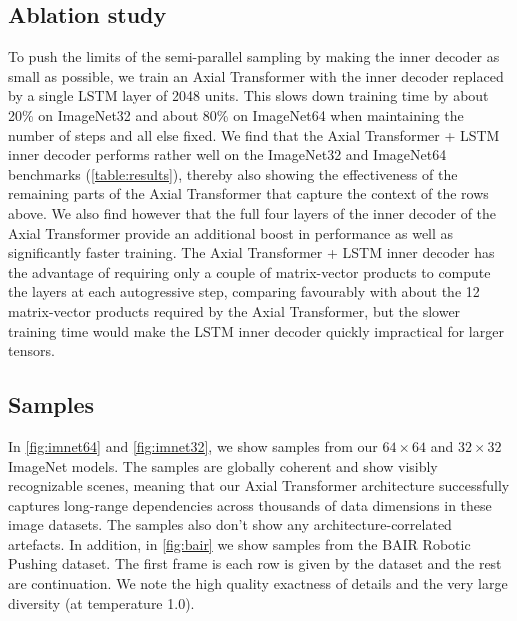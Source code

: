\documentclass{article} \usepackage{iclr2020_conference,times}
\begin{document}
\subsection{Ablation study}

To push the limits of the semi-parallel sampling by making the inner decoder as small as possible, we train an Axial Transformer with the inner decoder replaced by a single LSTM layer of 2048 units. This slows down training time by about 20\% on ImageNet32 and about 80\% on ImageNet64 when maintaining the number of steps and all else fixed. We find that the Axial Transformer + LSTM inner decoder performs rather well on the ImageNet32 and ImageNet64 benchmarks (\cref{table:results}), thereby also showing the effectiveness of the remaining parts of the Axial Transformer that capture the context of the rows above. We also find however that the full four layers of the inner decoder of the Axial Transformer provide an additional boost in performance as well as significantly faster training. The Axial Transformer + LSTM inner decoder has the advantage of requiring only a couple of matrix-vector products to compute the layers at each autogressive step, comparing favourably with about the 12 matrix-vector products required by the Axial Transformer, but the slower training time would make the LSTM inner decoder quickly impractical for larger tensors.

\subsection{Samples}

In \cref{fig:imnet64} and \cref{fig:imnet32}, we show samples from our $64 \times 64$ and $32 \times 32$ ImageNet models. The samples are globally coherent and show visibly recognizable scenes, meaning that our Axial Transformer architecture successfully captures long-range dependencies across thousands of data dimensions in these image datasets. The samples also don't show any architecture-correlated artefacts. In addition, in \cref{fig:bair} we show samples from the BAIR Robotic Pushing dataset. The first frame is each row is given by the dataset and the rest are continuation. We note the high quality exactness of details and the very large diversity (at temperature 1.0).
\end{document}
